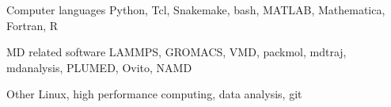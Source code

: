 
\begin{cvskills}
  
  \cvskill
    {Computer languages} %
    {Python, Tcl, Snakemake, bash, MATLAB, Mathematica, Fortran, R} %

  \cvskill
    {MD related software} %
    {LAMMPS, GROMACS, VMD, packmol, mdtraj, mdanalysis, PLUMED, Ovito, NAMD} %
  
  \cvskill
    {Other} %
    {Linux, high performance computing, data analysis, git} %
    
\end{cvskills}
